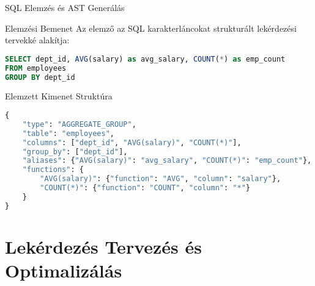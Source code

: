 \documentclass[aspectratio=169]{beamer}
\begin{document}
\begin{frame}[fragile]{SQL Elemzés és AST Generálás}
\begin{block}{Elemzési Bemenet}
Az elemző az SQL karakterláncokat strukturált lekérdezési tervekké alakítja:
\end{block}

\begin{lstlisting}[language=SQL]
SELECT dept_id, AVG(salary) as avg_salary, COUNT(*) as emp_count 
FROM employees 
GROUP BY dept_id
\end{lstlisting}

\begin{block}{Elemzett Kimenet Struktúra}
\begin{lstlisting}[language=Python]
{
    "type": "AGGREGATE_GROUP",
    "table": "employees",
    "columns": ["dept_id", "AVG(salary)", "COUNT(*)"],
    "group_by": ["dept_id"],
    "aliases": {"AVG(salary)": "avg_salary", "COUNT(*)": "emp_count"},
    "functions": {
        "AVG(salary)": {"function": "AVG", "column": "salary"},
        "COUNT(*)": {"function": "COUNT", "column": "*"}
    }
}
\end{lstlisting}
\end{block}
\end{frame}

\section{Lekérdezés Tervezés és Optimalizálás}
\end{document}
